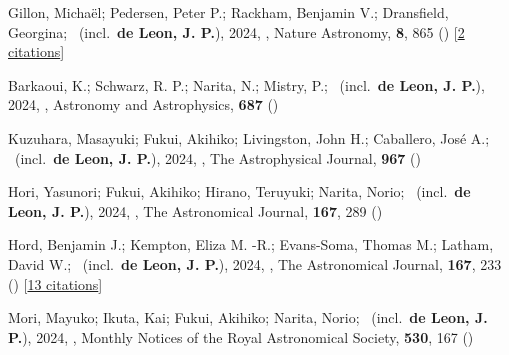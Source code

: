 \item[{\color{numcolor}\scriptsize68}] Gillon, Micha{\"e}l; Pedersen, Peter P.; Rackham, Benjamin V.; Dransfield, Georgina; \etal\ (incl.\ \textbf{de Leon, J. P.}), 2024, , Nature Astronomy, \textbf{8}, 865 () [\href{https://ui.adsabs.harvard.edu/abs/2024NatAs...8..865G}{2 citations}]

\item[{\color{numcolor}\scriptsize67}] Barkaoui, K.; Schwarz, R. P.; Narita, N.; Mistry, P.; \etal\ (incl.\ \textbf{de Leon, J. P.}), 2024, , Astronomy and Astrophysics, \textbf{687} ()

\item[{\color{numcolor}\scriptsize66}] Kuzuhara, Masayuki; Fukui, Akihiko; Livingston, John H.; Caballero, Jos{\'e} A.; \etal\ (incl.\ \textbf{de Leon, J. P.}), 2024, , The Astrophysical Journal, \textbf{967} ()

\item[{\color{numcolor}\scriptsize65}] Hori, Yasunori; Fukui, Akihiko; Hirano, Teruyuki; Narita, Norio; \etal\ (incl.\ \textbf{de Leon, J. P.}), 2024, , The Astronomical Journal, \textbf{167}, 289 ()

\item[{\color{numcolor}\scriptsize64}] Hord, Benjamin J.; Kempton, Eliza M. -R.; Evans-Soma, Thomas M.; Latham, David W.; \etal\ (incl.\ \textbf{de Leon, J. P.}), 2024, , The Astronomical Journal, \textbf{167}, 233 () [\href{https://ui.adsabs.harvard.edu/abs/2024AJ....167..233H}{13 citations}]

\item[{\color{numcolor}\scriptsize63}] Mori, Mayuko; Ikuta, Kai; Fukui, Akihiko; Narita, Norio; \etal\ (incl.\ \textbf{de Leon, J. P.}), 2024, , Monthly Notices of the Royal Astronomical Society, \textbf{530}, 167 ()

